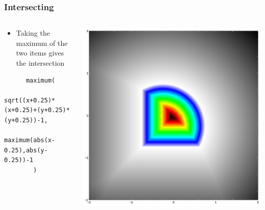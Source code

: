 \documentclass{beamer}
\begin{document}
\begin{frame}[fragile]
\frametitle{Intersecting}
\begin{columns}
  \begin{column}{0.75\textwidth}
    \lstset{basicstyle=\ttfamily\scriptsize}
    \begin{itemize}
    \item Taking the maximum of the two items gives the intersection
    \end{itemize}
    \begin{lstlisting}
      maximum(
        sqrt((x+0.25)*(x+0.25)+(y+0.25)*(y+0.25))-1,
        maximum(abs(x-0.25),abs(y-0.25))-1
        )
    \end{lstlisting}
  \end{column}
  \begin{column}{0.25\textwidth}
    \includegraphics[width=1.0\textwidth, right]{implicit_intersection_square_circle.jpg}
  \end{column}
\end{columns}
\end{frame}
\end{document}
